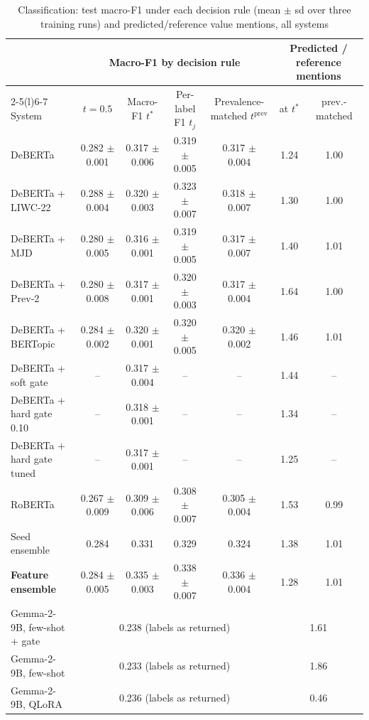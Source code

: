 \begin{table}[t]
\caption{Classification: test macro-F1 under each decision rule (mean $\pm$ sd over three training runs) and predicted/reference value mentions, all systems}
\label{tab:classification-full}
\centering
\footnotesize
\begin{tabular}{@{}lcccccc@{}}
\toprule
 & \multicolumn{4}{c}{Macro-F1 by decision rule} & \multicolumn{2}{c}{Predicted / reference mentions} \\
\cmidrule(lr){2-5}\cmidrule(l){6-7}
System & $t = 0.5$ & Macro-F1 $t^*$ & Per-label F1 $t_j$ & Prevalence-matched $t^{\mathrm{prev}}$ & at $t^*$ & prev.-matched \\
\midrule
DeBERTa & 0.282 $\pm$ 0.001 & 0.317 $\pm$ 0.006 & 0.319 $\pm$ 0.005 & 0.317 $\pm$ 0.004 & 1.24 & 1.00 \\
DeBERTa + LIWC-22 & 0.288 $\pm$ 0.004 & 0.320 $\pm$ 0.003 & 0.323 $\pm$ 0.007 & 0.318 $\pm$ 0.007 & 1.30 & 1.00 \\
DeBERTa + MJD & 0.280 $\pm$ 0.005 & 0.316 $\pm$ 0.001 & 0.319 $\pm$ 0.005 & 0.317 $\pm$ 0.007 & 1.40 & 1.01 \\
DeBERTa + Prev-2 & 0.280 $\pm$ 0.008 & 0.317 $\pm$ 0.001 & 0.320 $\pm$ 0.003 & 0.317 $\pm$ 0.004 & 1.64 & 1.00 \\
DeBERTa + BERTopic & 0.284 $\pm$ 0.002 & 0.320 $\pm$ 0.001 & 0.320 $\pm$ 0.005 & 0.320 $\pm$ 0.002 & 1.46 & 1.01 \\
\addlinespace
DeBERTa + soft gate & -- & 0.317 $\pm$ 0.004 & -- & -- & 1.44 & -- \\
DeBERTa + hard gate 0.10 & -- & 0.318 $\pm$ 0.001 & -- & -- & 1.34 & -- \\
DeBERTa + hard gate tuned & -- & 0.317 $\pm$ 0.001 & -- & -- & 1.25 & -- \\
\addlinespace
RoBERTa & 0.267 $\pm$ 0.009 & 0.309 $\pm$ 0.006 & 0.308 $\pm$ 0.007 & 0.305 $\pm$ 0.004 & 1.53 & 0.99 \\
Seed ensemble & 0.284 & 0.331 & 0.329 & 0.324 & 1.38 & 1.01 \\
\textbf{Feature ensemble} & 0.284 $\pm$ 0.005 & 0.335 $\pm$ 0.003 & 0.338 $\pm$ 0.007 & 0.336 $\pm$ 0.004 & 1.28 & 1.01 \\
\midrule
Gemma-2-9B, few-shot + gate & \multicolumn{4}{c}{0.238 (labels as returned)} & \multicolumn{2}{c}{1.61} \\
Gemma-2-9B, few-shot & \multicolumn{4}{c}{0.233 (labels as returned)} & \multicolumn{2}{c}{1.86} \\
Gemma-2-9B, QLoRA & \multicolumn{4}{c}{0.236 (labels as returned)} & \multicolumn{2}{c}{0.46} \\

\end{tabular}
\end{table}
